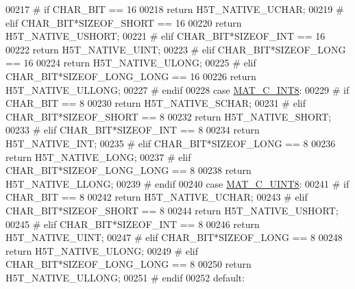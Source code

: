 \begin{DoxyCode}
00217 \textcolor{preprocessor}{#       if CHAR\_BIT == 16}
00218             \textcolor{keywordflow}{return} H5T\_NATIVE\_UCHAR;
00219 \textcolor{preprocessor}{#       elif CHAR\_BIT*SIZEOF\_SHORT == 16}
00220             \textcolor{keywordflow}{return} H5T\_NATIVE\_USHORT;
00221 \textcolor{preprocessor}{#       elif CHAR\_BIT*SIZEOF\_INT == 16}
00222             \textcolor{keywordflow}{return} H5T\_NATIVE\_UINT;
00223 \textcolor{preprocessor}{#       elif CHAR\_BIT*SIZEOF\_LONG == 16}
00224             \textcolor{keywordflow}{return} H5T\_NATIVE\_ULONG;
00225 \textcolor{preprocessor}{#       elif CHAR\_BIT*SIZEOF\_LONG\_LONG == 16}
00226             \textcolor{keywordflow}{return} H5T\_NATIVE\_ULLONG;
00227 \textcolor{preprocessor}{#       endif}
00228         \textcolor{keywordflow}{case} \hyperlink{group___m_a_t_ggad4d60ae7b709fc81bfd744fb4c857c40a984ff310f9e906100fcff95f704f43c5}{MAT\_C\_INT8}:
00229 \textcolor{preprocessor}{#       if CHAR\_BIT == 8}
00230             \textcolor{keywordflow}{return} H5T\_NATIVE\_SCHAR;
00231 \textcolor{preprocessor}{#       elif CHAR\_BIT*SIZEOF\_SHORT == 8}
00232             \textcolor{keywordflow}{return} H5T\_NATIVE\_SHORT;
00233 \textcolor{preprocessor}{#       elif CHAR\_BIT*SIZEOF\_INT == 8}
00234             \textcolor{keywordflow}{return} H5T\_NATIVE\_INT;
00235 \textcolor{preprocessor}{#       elif CHAR\_BIT*SIZEOF\_LONG == 8}
00236             \textcolor{keywordflow}{return} H5T\_NATIVE\_LONG;
00237 \textcolor{preprocessor}{#       elif CHAR\_BIT*SIZEOF\_LONG\_LONG == 8}
00238             \textcolor{keywordflow}{return} H5T\_NATIVE\_LLONG;
00239 \textcolor{preprocessor}{#       endif}
00240         \textcolor{keywordflow}{case} \hyperlink{group___m_a_t_ggad4d60ae7b709fc81bfd744fb4c857c40a81270f8093cb4808e992c1d29d84d4e3}{MAT\_C\_UINT8}:
00241 \textcolor{preprocessor}{#       if CHAR\_BIT == 8}
00242             \textcolor{keywordflow}{return} H5T\_NATIVE\_UCHAR;
00243 \textcolor{preprocessor}{#       elif CHAR\_BIT*SIZEOF\_SHORT == 8}
00244             \textcolor{keywordflow}{return} H5T\_NATIVE\_USHORT;
00245 \textcolor{preprocessor}{#       elif CHAR\_BIT*SIZEOF\_INT == 8}
00246             \textcolor{keywordflow}{return} H5T\_NATIVE\_UINT;
00247 \textcolor{preprocessor}{#       elif CHAR\_BIT*SIZEOF\_LONG == 8}
00248             \textcolor{keywordflow}{return} H5T\_NATIVE\_ULONG;
00249 \textcolor{preprocessor}{#       elif CHAR\_BIT*SIZEOF\_LONG\_LONG == 8}
00250             \textcolor{keywordflow}{return} H5T\_NATIVE\_ULLONG;
00251 \textcolor{preprocessor}{#       endif}
00252         \textcolor{keywordflow}{default}:

\end{DoxyCode}
